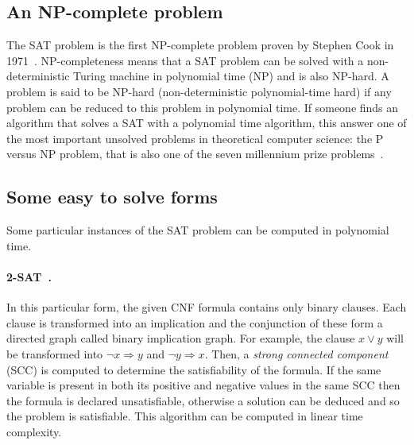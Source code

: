 \subsection{An NP-complete problem}
The SAT problem is the first NP-complete problem proven by Stephen Cook in 1971~\cite{cook1971complexity}.
NP-completeness means that a SAT problem can be solved with a non-deterministic Turing machine in polynomial time (NP) and is also NP-hard.
A problem is said to be NP-hard (non-deterministic polynomial-time hard) if 
any problem can be reduced to this problem in polynomial time.
If someone finds an algorithm that solves a SAT with a polynomial time algorithm, this answer 
one of the most important unsolved problems in theoretical computer science: the P versus NP problem,
 that is also one of the seven millennium prize problems~\cite{carlson2006millennium}.
\subsection{Some easy to solve forms}
Some particular instances of the SAT problem can be computed in polynomial time.

\paragraph{2-SAT~\cite{aspvall1979linear}.}

In this particular form, the given CNF formula contains only binary clauses.
Each clause is transformed into an implication and the conjunction of these form a directed graph called
binary implication graph.
For example, the clause $x \lor y$ will be transformed into $ \neg x \Rightarrow y$ and $\neg y \Rightarrow x$.
Then, a \emph{strong connected component} (SCC) is computed to determine the satisfiability of the formula.
If the same variable is present in both its positive and negative values in the same SCC then the formula is declared unsatisfiable,
otherwise a solution can be deduced and so the problem is satisfiable. 
This algorithm can be computed in linear time complexity.



